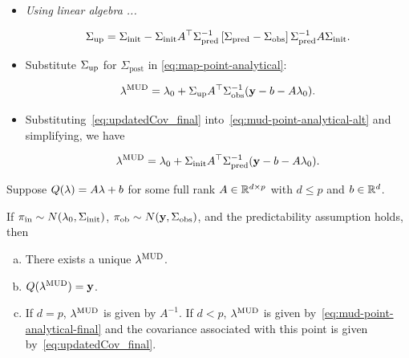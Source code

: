 \begin{frame}
\begin{itemize}
\item \emph{Using linear algebra ...}

\begin{equation}\label{eq:updatedCov_final}
	\Sigma_\text{up} = \Sigma_\text{init} - \Sigma_\text{init} A^\top \Sigma_\text{pred}^{-1}\left[\Sigma_\text{pred}-\Sigma_\text{obs}\right]\Sigma_\text{pred}^{-1}A\Sigma_\text{init}.
\end{equation}

\bigskip
\item Substitute $\Sigma_\text{up}$ for $\Sigma_\text{post}$ in \eqref{eq:map-point-analytical}:

\begin{equation}\label{eq:mud-point-analytical-alt}
\lambda^{\text{MUD}} = \lambda_0 + \Sigma_\text{up} A^\top \Sigma_\text{obs}^{-1} (\mathbf{y} - b - A\lambda_0).
\end{equation}

\bigskip
\item Substituting~\eqref{eq:updatedCov_final} into~\eqref{eq:mud-point-analytical-alt} and simplifying, we have

\begin{equation}\label{eq:mud-point-analytical-final}
	\lambda^{\text{MUD}} = \lambda_0 + \Sigma_\text{init} A^\top \Sigma_\text{pred}^{-1}(\mathbf{y} - b - A\lambda_0).
\end{equation}

\end{itemize}

\end{frame}

\begin{frame}

\begin{thm}\label{thm:MUD_existence_uniqueness}

Suppose  $Q(\lambda)=A\lambda+b$ for some full rank $A\in\mathbb{R}^{d\times p}$ with $d\leq p$ and $b\in\mathbb{R}^d$.

If $\operatorname*{\pi_{in}} \sim N(\lambda_0,\Sigma_\text{init})$, $\operatorname*{\pi_{ob}}\sim N(\mathbf{y},\Sigma_\text{obs})$, and the predictability assumption holds, then

\begin{enumerate}[(a)]
\item There exists a unique $\lambda^{\text{MUD}}$.
\item $Q(\lambda^{\text{MUD}}) = \mathbf{y}$.
\item If $d=p$, $\lambda^{\text{MUD}}$ is given by $A^{-1}$. If $d<p$, $\lambda^{\text{MUD}}$ is given by~\eqref{eq:mud-point-analytical-final} and the covariance associated with this point is given by~\eqref{eq:updatedCov_final}.
\end{enumerate}
\end{thm}

\end{frame}

